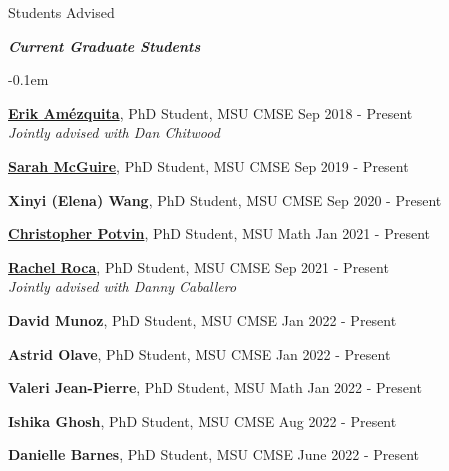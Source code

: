 \documentclass{resume} %
\begin{document}
\begin{rSection}{Students Advised}


\textbf{\textit{Current Graduate Students}}
\begin{list}{}{\leftmargin=1em}
   \itemsep -0.1em %






   \item \textbf{\href{https://www.egr.msu.edu/~amezqui3/aboutme.html}{Erik Am\'ezquita}}, PhD Student, MSU CMSE \hfill Sep 2018 - Present
\\
   \phantom{XXX} \textit{Jointly advised with Dan Chitwood}
   \item \textbf{\href{https://www.egr.msu.edu/~mcgui176/}{Sarah McGuire}}, PhD Student, MSU CMSE \hfill Sep 2019 - Present


   \item \textbf{Xinyi (Elena) Wang}, PhD Student, MSU CMSE \hfill Sep 2020 - Present

   \item \textbf{\href{https://sites.google.com/view/christopherpotvin/home}{Christopher Potvin}}, PhD Student, MSU Math \hfill Jan 2021 - Present

   \item \textbf{\href{https://sites.google.com/manhattan.edu/racheleroca/home}{Rachel Roca}}, PhD Student, MSU CMSE \hfill Sep 2021 - Present
\\
   \phantom{XXX} \textit{Jointly advised with Danny Caballero}


   \item \textbf{David Munoz}, PhD Student, MSU CMSE \hfill Jan 2022 - Present
   

   \item \textbf{Astrid Olave}, PhD Student, MSU CMSE \hfill Jan 2022 - Present
   

   \item \textbf{Valeri Jean-Pierre}, PhD Student, MSU Math \hfill Jan 2022 - Present
   
   \item \textbf{Ishika Ghosh}, PhD Student, MSU CMSE \hfill Aug 2022 - Present
   
   \item \textbf{Danielle Barnes}, PhD Student, MSU CMSE \hfill June 2022 - Present




\end{list}



\end{rSection}
\end{document}
